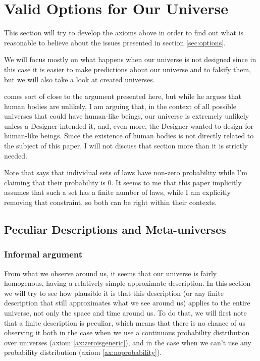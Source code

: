 \documentclass[a4paper
,draft
]{article}
\newcommand{\paper}[1]{paper}
\newcommand{\ghilimele}[1]{``#1"}
\begin{document}
\section{Valid Options for Our Universe}
\label{sec:valid-options}

This section will try to develop the axioms above in order to find out what
is reasonable to believe about the issues presented in
section \ref{sec:options}.

We will focus mostly on what happens when our universe is not designed
since in this case it is easier to make predictions about our universe
and to falsify them, but we will also take a look at created universes.

\textcite[][Section \ghilimele{Why a world with human bodies is unlikely
if there is no God}]{Swinburne2003} comes sort of close to the argument
presented here, but while he
argues that human bodies are unlikely, I am arguing that, in the context
of all possible universes that could have human-like beings,
our universe is extremely unlikely unless a Designer intended it,
and, even more, the Designer wanted to design for human-like
beings.
Since the existence of human bodies is not directly related to the subject
of this \paper{}, I will not discuss that section more
than it is strictly needed.

Note that \textcite{Swinburne2003} says that individual sets of laws
have non-zero probability while I'm claiming that their probability is $0$.
It seems to me that this paper implicitly assumes that
such a set has a finite number of laws, while I am explicitly removing
that constraint, so both can be right within their contexts.

\subsection{Peculiar Descriptions and Meta-universes}
\label{fdaumu}

\subsubsection{Informal argument}

From what we observe around us, it seems that our universe is fairly homogenous,
having a relatively simple approximate description.
In this section we will try to see how plausible it is that this description
(or any finite description that still approximates what we see around us)
applies to the entire universe, not only the space and time around us.
To do that, we will first note that a finite description is peculiar,
which means that there is no chance of
us observing it both in the case when we use a continuous probability
distribution over universes (axiom \ref{ax:zeroisgeneric}),
and in the case when we can't use any probability
distribution (axiom \ref{ax:noprobability}).
\end{document}
